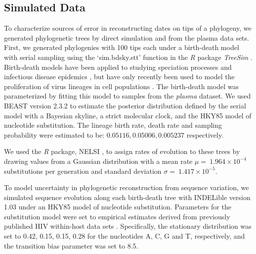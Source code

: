 \documentclass[12pt]{article}
\begin{document}
\subsection * {Simulated Data} \label{subsec:simdata}


To characterize sources of error in reconstructing dates on tips of a phylogeny, we generated phylogenetic trees by direct simulation and from the plasma data sets.
First, we generated phylogenies with 100 tips each under a birth-death model with serial sampling using the `sim.bdsky.stt' function in the \textit{R} package \textit{TreeSim} \citep{Boskova14}.
Birth-death models have been applied to studying speciation processes \citep{Nee:2006} and infectious disease epidemics \citep{Stradler13}, but have only recently been used to model the proliferation of virus lineages in cell populations \citep{Hartfield:2015}.
The birth-death model was parameterized by fitting this model to samples from the {\em plasma} dataset.
We used BEAST version 2.3.2 to estimate the posterior distribution defined by the serial model with a Bayesian skyline, a strict molecular clock, and the HKY85 \citep{HKY85} model of nucleotide substitution.
The lineage birth rate, death rate and sampling probability were estimated to be: $0.05116, 0.05006, 0.005237$ respectively.

We used the \textit{R} package, NELSI \citep{NELSI}, to assign rates of evolution to these trees by drawing values from a Gaussian distribution with a mean rate $\mu = \ 1.964\times 10^{-4}$ substitutions per generation and standard deviation $\sigma = \ 1.417\times 10^{-5}$. %

To model uncertainty in phylogenetic reconstruction from sequence variation, we simulated sequence evolution along each birth-death tree with INDELible version 1.03 \citep{Indelible09} under an HKY85 \citep{HKY85} model of nucleotide substitution.
Parameters for the substitution model were set to empirical estimates derived from previously published HIV within-host data sets \citep{McCloskey14}. 
Specifically, the stationary distribution was set to 0.42, 0.15, 0.15, 0.28 for the nucleotides A, C, G and T, respectively, and the transition bias parameter was set to 8.5.
\end{document}
